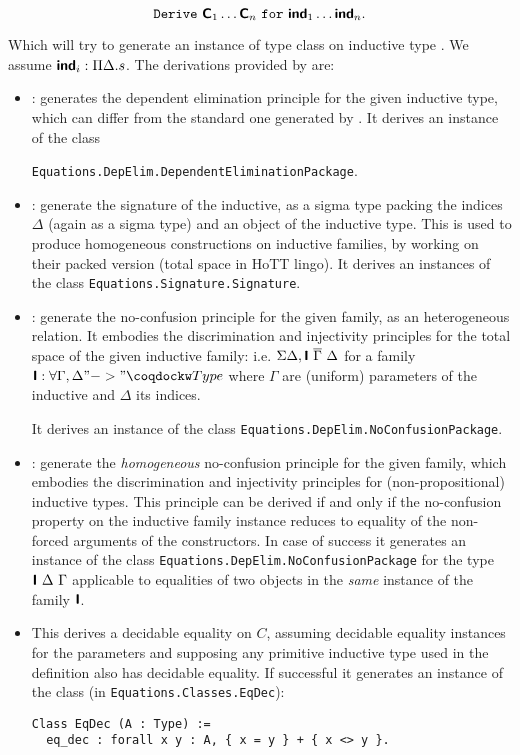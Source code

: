 \[\mathtt{Derive}~\textbf{\mbox{\textsf{C}}}_1 \ldots \textbf{\mbox{\textsf{C}}}_n~\mathtt{for}~\textbf{\mbox{\textsf{ind}}}_1 \ldots \textbf{\mbox{\textsf{ind}}}_n.\]

Which will try to generate an instance of type class  on
inductive type . We assume $\textbf{\mbox{\textsf{ind}}}_i : \Pi \Delta. s$.
The derivations provided by \Equations are:

\begin{itemize}
\item {}: generates the dependent
  elimination principle for the given inductive type, which can differ
  from the standard one generated by \Coq.
  It derives an instance of the class

  \texttt{Equations.DepElim.DependentEliminationPackage}.
\item {}: generate the signature of the inductive, as a
  sigma type packing the indices $\Delta$ (again as a sigma type) and
  an object of the inductive type. This is used to produce homogeneous
  constructions on inductive families, by working on their packed
  version (total space in HoTT lingo).
  It derives an instances of the class
  \texttt{Equations.Signature.Signature}.

\item {}: generate the no-confusion principle for the
  given family, as an heterogeneous relation. It embodies the
  discrimination and injectivity principles for the
  total space of the given inductive family: i.e.
  $\Sigma \Delta, \textbf{\mbox{\textsf{I}}}~{\overline \Gamma}~\Delta$ for a family
  $\ind{I} : \forall \Gamma, \Delta "->" \kw{Type}$ where $\Gamma$ are
  (uniform) parameters of the inductive and $\Delta$ its indices.

  It derives an instance of the class \texttt{Equations.DepElim.NoConfusionPackage}.

\item {}: generate the \emph{homogeneous} no-confusion
  principle for the given family, which embodies the discrimination and
  injectivity principles for (non-propositional) inductive types.
  This principle can be derived if and only if the no-confusion property
  on the inductive family instance reduces to equality of the non-forced
  arguments of the constructors. In case of success it generates an instance of the class
  \texttt{Equations.DepElim.NoConfusionPackage} for the type $\textbf{\mbox{\textsf{I}}}~
  \Delta~\Gamma$ applicable to equalities of two objects in the \emph{same}
  instance of the family $\textbf{\mbox{\textsf{I}}}$.

\item {}
  This derives a decidable equality on $C$, assuming decidable equality 
  instances for the parameters and supposing any primitive inductive
  type used in the definition also has decidable equality. If
  successful it generates an instance of the class (in \texttt{Equations.Classes.EqDec}):
\begin{verbatim}
Class EqDec (A : Type) :=
  eq_dec : forall x y : A, { x = y } + { x <> y }.
\end{verbatim}
  

\end{itemize}
